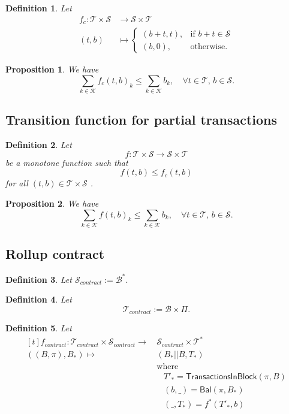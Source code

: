 \documentclass[runningheads]{llncs}
\newtheorem{defn}{Definition}
\newtheorem{prop}{Proposition}
\newcommand{\K}{\mathcal{K}}
\newcommand{\T}{\mathcal{T}}
\renewcommand{\S}{\mathcal{S}}
\newcommand{\B}{\mathcal{B}}
\begin{document}
\begin{defn}
  Let
  \begin{align*}
    f_c : \T \times \S &\to \S \times \T \\
    (t,b) &\mapsto
    \begin{cases}
      (b + t, t), & \text{if \(b + t \in \S\)} \\
      (b, 0),            & \text{otherwise}.
    \end{cases}
  \end{align*}
\end{defn}

\begin{prop}
  We have
  \begin{equation*}
    \sum_{k \in \K} f_c(t,b)_k \leq \sum_{k \in
    \K} b_k, \quad \forall t \in \T,\, b \in \S.
  \end{equation*}
\end{prop}

\subsection{Transition function for partial transactions}

\begin{defn}
  Let
  \[f : \T \times \S \to \S \times \T\] be a monotone function such that
  \[f(t,b) \leq f_c(t,b)\] for all \((t,b) \in \T \times \S\)
  .
\end{defn}

\begin{prop}
  We have
  \begin{equation*}
    \sum_{k \in \K} f(t,b)_k \leq \sum_{k \in \K} b_k,
    \quad \forall t \in \T,\, b \in \S.
  \end{equation*}
\end{prop}

\subsection{Rollup contract}

\begin{defn}
  Let \(\S_{contract} := \B^*.\)
\end{defn}

\begin{defn}
  Let \[\T_{contract} := \B \times \Pi.\]
\end{defn}

\begin{defn}
  Let
  \[
    \begin{aligned}[t]
      f_{contract} \colon \T_{contract} \times \S_{contract} \to
      &\, \S_{contract} \times \T^*
      \\
      ((B,\pi), B_*)
      \mapsto &\, (B_* || B, T_*) \\
      &\, \text{where} \\
      & \quad T'_* = \mathsf{TransactionsInBlock}(\pi, B) \\
      & \quad (b,\_) = \mathsf{Bal}(\pi,B_*) \\
      & \quad (\_,T_*) = f^*(T'_*,b)
    \end{aligned}
  \]
\end{defn}
\end{document}
